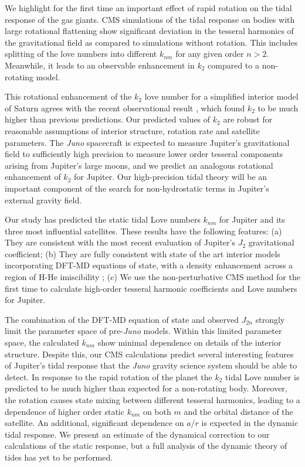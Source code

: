 We highlight for the first time an important effect of rapid rotation on the tidal
response of the gas giants. CMS simulations of the tidal response on bodies with
large rotational flattening show significant deviation in the tesseral harmonics of
the gravitational field as compared to simulations without rotation. This includes
splitting of the love numbers into different $k_{nm}$ for any given order $n>2$.
Meanwhile, it leads to an observable enhancement in $k_2$ compared to a non-rotating
model.

This rotational enhancement of the $k_2$ love number for a simplified interior model
of Saturn agrees with the recent observational result \citep{lainey2016}, which found
$k_2$ to be much higher than previous predictions. Our predicted values of $k_2$ are
robust for reasonable assumptions of interior structure, rotation rate and satellite
parameters.  The \textit{Juno} spacecraft is expected to measure Jupiter's
gravitational field to sufficiently high precision to measure lower order tesseral
components arising from Jupiter's large moons, and we predict an analogous rotational
enhancement of $k_2$ for Jupiter.  Our high-precision tidal theory will be an
important component of the search for non-hydrostatic terms in Jupiter's external
gravity field.

Our study has predicted the static tidal Love numbers $k_{nm}$ for Jupiter and its three
most influential satellites. These results have the following features: (a) They are
consistent with the most recent evaluation of Jupiter's $J_2$ gravitational
coefficient; (b) They are fully consistent with state of the art interior models
\citep{hubbard2016} incorporating DFT-MD equations of state, with a density
enhancement across a region of H-He imiscibility \citep{morales2013}; (c) We use the
non-perturbative CMS method for the first time to calculate high-order tesseral
harmonic coefficients and Love numbers for Jupiter.

The combination of the DFT-MD equation of state and observed $J_{2n}$ strongly limit
the parameter space of pre-\textit{Juno} models. Within this limited parameter space,
the calculated $k_{nm}$ show minimal dependence on details of the interior structure.
Despite this, our CMS calculations predict several interesting features of Jupiter's
tidal response that the \textit{Juno} gravity science system should be able to
detect. In response to the rapid rotation of the planet the $k_2$ tidal Love number
is predicted to be much higher than expected for a non-rotating body. Moreover, the
rotation causes state mixing between different tesseral harmonics, leading to a
dependence of higher order static $k_{nm}$ on both $m$ and the orbital distance of the
satellite. An additional, significant dependence on $a/r$ is expected in the dynamic
tidal response. We present an estimate of the dynamical correction to our
calculations of the static response, but a full analysis of the dynamic theory of
tides has yet to be performed.


